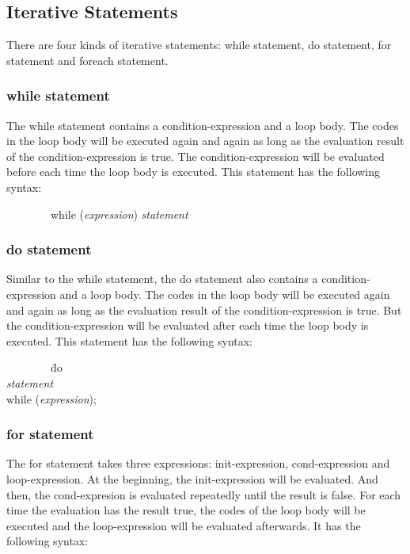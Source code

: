 \documentclass[12pt,psfig,a4]{article}
\begin{document}
\subsection{Iterative Statements}
There are four kinds of iterative statements: while statement, do statement, for statement and foreach statement.

\subsubsection{while statement}
The while statement contains a condition-expression and a loop body. The codes in the loop body will be executed again and again as long as the evaluation result of the condition-expression is true. The condition-expression will be evaluated before each time the loop body is executed. This statement has the following syntax:

\begin{code}
\begin{tabbing}
~~~~~~~~while (\textsl{expression}) \textsl{statement}
\end{tabbing}
\end{code}

\subsubsection{do statement}
Similar to the while statement, the do statement also contains a condition-expression and a loop body. The codes in the loop body will be executed again and again as long as the evaluation result of the condition-expression is true. But the condition-expression will be evaluated after each time the loop body is executed. This statement has the following syntax:

\begin{code}
\begin{tabbing}
~~~~~~~~\= do \= \\
\> \> \textsl{statement} \\
\> while (\textsl{expression});
\end{tabbing}
\end{code}

\subsubsection{for statement}
The for statement takes three expressions: init-expression, cond-expression and loop-expression. At the beginning, the init-expression will be evaluated. And then, the cond-expresion is evaluated repeatedly until the result is false. For each time the evaluation has the result true, the codes of the loop body will be executed and the loop-expression will be evaluated afterwards. It has the following syntax:
\end{document}
